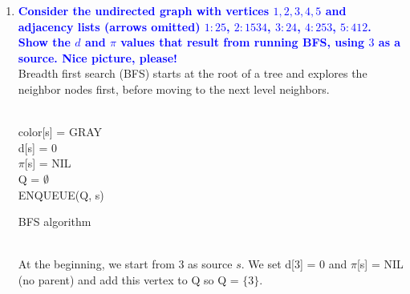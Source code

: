 \documentclass[11pt]{article}
\begin{document}
\begin{enumerate}
\item \textbf{\textcolor{blue}{Consider the undirected graph with vertices $1,2,3,4,5$ and adjacency lists (arrows omitted) $1:25$, $2:1534$, $3:24$, $4:253$, $5:412$.  Show the $d$ and
$\pi$ values that result from running BFS, using $3$ as a source.  Nice picture, please!}}
    \\ Breadth first search (BFS) starts at the root of a tree and explores the neighbor nodes first, before moving to the next level neighbors.
    \\
    \begin{algorithm}[H]
    \Indm{}\\
    \Indp
        color[s] = GRAY \\
        d[s] = 0 \\
        $\pi$[s] = NIL \\
        Q = $\emptyset$ \\
        ENQUEUE(Q, s) \\
    \caption{BFS algorithm}
    \end{algorithm}
    \\ At the beginning, we start from 3 as source $s$. We set d[3] = 0 and $\pi$[s] = NIL (no parent) and add this vertex to Q so Q = $\{3\}$. \\
\end{enumerate}
\end{document}

